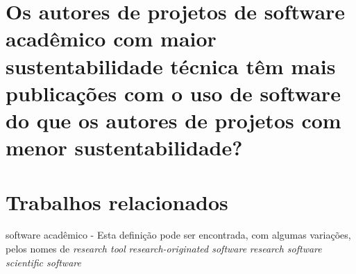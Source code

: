 \section{Os autores de projetos de software acadêmico com maior sustentabilidade técnica têm mais publicações com o uso de software do que os autores de projetos com menor sustentabilidade?}

\section{Trabalhos relacionados}

software acadêmico - Esta definição pode ser encontrada, com algumas variações, pelos nomes de
{\it research tool} %
{\it research-originated software} %
{\it research software} %
{\it scientific software} %


%
%

